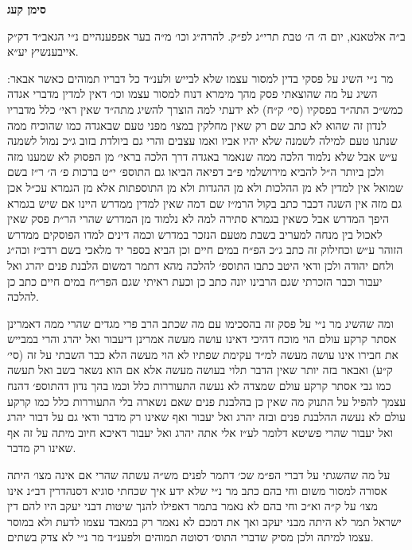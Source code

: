 \documentclass[12pt, openany]{book}
\newcommand{\chapname}{}
\newcommand{\newchap}[1]{
	\addcontentsline{toc}{chapter}{#1}
	\renewcommand{\chapname}{#1}
		\begin{center}
			\textbf{%
\fontsize{16pt}{16pt}\selectfont
				#1}
		\end{center}
}
\begin{document}
\newchap{סימן קעג}
\begin{multicols}{2}
ב״ה אלטאנא, יום ה׳ ה׳ טבת תרי״ג לפ״ק. להרה״ג וכו׳ מ״ה בער אפפענהיים נ״י הגאב״ד דק״ק אייבענשיץ יע״א.\\\vspace{0pt}

מר נ״י השיג על פסקי בדין למסור עצמו שלא לבייש ולענ״ד כל דבריו תמוהים כאשר אבאר: השיג על מה שהוצאתי פסק מהך מימרא דנוח למסור עצמו וכו׳ דאין למדין מדברי אגדה כמש״כ התה״ד בפסקיו (סי׳ ק״ח) לא ידעתי למה הוצרך להשיג מתה״ד שאין ראי׳ כלל מדבריו לנדון זה שהוא לא כתב שם רק שאין מחלקין במצו׳ מפני טעם שבאגדה כמו שהוכיח ממה שנתנו טעם למילה לשמנה שלא יהיו אביו ואמו עצבים והרי גם ביולדת בזוב ג״כ נמול לשמנה ע״ש אבל שלא נלמוד הלכה ממה שנאמר באגדה דרך הלכה בראי׳ מן הפסוק לא שמענו מזה ולכן ביותר ה״ל להביא מירושלמי פ״ב דפיאה הביאו גם התוספ׳ י״ט ברכות פ׳ ה׳ ר״ז בשם שמואל אין למדין לא מן ההלכות ולא מן ההגדות ולא מן התוספתות אלא מן הגמרא עכ״ל אכן גם מזה אין השגה דכבר כתב בקול הרמ״ז שם דמה שאין למדין ממדרש היינו אם שיש בגמרא היפך המדרש אבל כשאין בגמרא סתירה למה לא נלמוד מן המדרש שהרי הר״ת פסק שאין לאכול בין מנחה למעריב בשבת מטעם הנזכר במדרש וכמה דינים למדו הפוסקים ממדרש הזוהר ע״ש וכחילוק זה כתב ג״כ הפ״ח במים חיים וכן הביא בספר יד מלאכי בשם רדב״ז וכה״ג ולחם יהודה ולכן ודאי היטב כתבו התוספ׳ להלכה מהא דתמר דמשום הלבנת פנים יהרג ואל יעבור וכבר הזכרתי שגם הרבינו יונה כתב כן וכעת ראיתי שגם הפר״ח במים חיים כתב כן להלכה.\\\vspace{0pt}

ומה שהשיג מר נ״י על פסק זה בהסכימו עם מה שכתב הרב פרי מגדים שהרי ממה דאמרינן אסתר קרקע עולם הוי מוכח דהיכי דאינו עושה מעשה אמרינן דיעבור ואל יהרג והרי במבייש את חבירו אינו עושה מעשה למ״ד עקימת שפתיו לא הוי מעשה הלא כבר השבתי על זה (סי׳ ק״ע) ואבאר בזה יותר שאין הדבר תלוי בעושה מעשה אלא אם הוא נשאר בשב ואל תעשה כמו גבי אסתר קרקע עולם שמצדה לא נעשה התעוררות כלל וכמו בהך נדון דהתוספ׳ דהנח עצמך להפיל על התנוק מה שאין כן בהלבנת פנים שאם נשארה בלי התעוררות כלל כמו קרקע עולם לא נעשה ההלבנת פנים ובזה יהרג ואל יעבור ואף שאינו רק מדבר ודאי גם על דבור יהרג ואל יעבור שהרי פשיטא דלומר לע״ז אלי אתה יהרג ואל יעבור דאיכא חיוב מיתה על זה אף שאינו רק מדבר.\\\vspace{0pt}

על מה שהשגתי על דברי הפ״מ שכ׳ דתמר לפנים מש״ה עשתה שהרי אם אינה מצו׳ היתה אסורה למסור משום וחי בהם כתב מר נ״י שלא ידע איך שכחתי סוגיא דסנהדרין דב״נ אינו מצו׳ על ק״ה וא״כ וחי בהם לא נאמר בתמר דאפילו להנך שיטות דבני יעקב היו להם דין ישראל תמר לא היתה מבני יעקב ואך את דמכם לא נאמר רק במאבד עצמו לדעת ולא במוסר עצמו למיתה ולכן מסיק שדברי התוס׳ דסוטה תמוהים ולפענ״ד מר נ״י לא צדק בשתים.\\\vspace{0pt}


\end{multicols}
\end{document}
